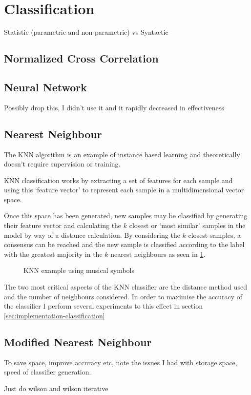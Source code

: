 \section{Classification}

Statistic (parametric and non-parametric) vs Syntactic

\subsection{Normalized Cross Correlation}

\subsection{Neural Network}
Possibly drop this, I didn't use it and it rapidly decreased in effectiveness

\subsection{Nearest Neighbour}

The \acrfull{KNN} algorithm is an example of instance based learning and theoretically doesn't require supervision or training.

KNN classification works by extracting a set of features for each sample and using this `feature vector' to represent each sample in a multidimensional vector space.

Once this space has been generated, new samples may be classified by generating their feature vector and calculating the $k$ closest or `most similar' samples in the model by way of a distance calculation. By considering the $k$ closest samples, a consensus can be reached and the new sample is classified according to the label with the greatest majority in the $k$ nearest neighbours as seen in \ref{fig:knn-example}.

 \begin{figure}[h!]
   \centering
   \caption{KNN example using musical symbols}
   \label{fig:knn-example}
 \end{figure}

The two most critical aspects of the KNN classifier are the distance method used and the number of neighbours considered. In order to maximise the accuracy of the classifier I perform several experiments to this effect in section \ref{sec:implementation-classification}

\subsection{Modified Nearest Neighbour}

To save space, improve accuracy etc, note the issues I had with storage space, speed of classifier generation.

Just do wilson and wilson iterative
